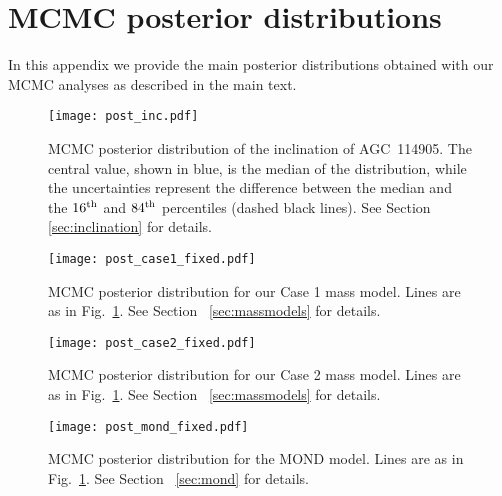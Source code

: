 \documentclass[fleqn,usenatbib]{mnras}
\begin{document}
\section{MCMC posterior distributions}
In this appendix we provide the main posterior distributions obtained with our MCMC analyses as described in the main text. 
\label{sec:appendix}
\begin{figure}
    \centering
    \texttt{[image: post\_inc.pdf]}
    \caption{MCMC posterior distribution of the inclination of AGC~114905. The central value, shown in blue, is the median of the distribution, while the uncertainties represent the difference between the median and the $16^{\rm th}$ and $84^{\rm th}$ percentiles (dashed black lines). See Section~ \ref{sec:inclination} for details.}
    \label{fig:posterior_inc}
\end{figure}

\begin{figure}
    \centering
    \texttt{[image: post\_case1\_fixed.pdf]}
    \caption{MCMC posterior distribution for our Case 1 mass model. Lines are as in Fig.~\ref{fig:posterior_inc}. See Section~ \ref{sec:massmodels} for details.}
    \label{fig:posterior_case1}
\end{figure}

\begin{figure}
    \centering
    \texttt{[image: post\_case2\_fixed.pdf]}
    \caption{MCMC posterior distribution for our Case 2 mass model. Lines are as in Fig.~\ref{fig:posterior_inc}. See Section~ \ref{sec:massmodels} for details.}
    \label{fig:posterior_case2}
\end{figure}

\begin{figure}
    \centering
    \texttt{[image: post\_mond\_fixed.pdf]}
    \caption{MCMC posterior distribution for the MOND model. Lines are as in Fig.~\ref{fig:posterior_inc}. See Section~ \ref{sec:mond} for details.}
    \label{fig:posterior_mond}
\end{figure}



\bsp	%
\label{lastpage}
\end{document}
